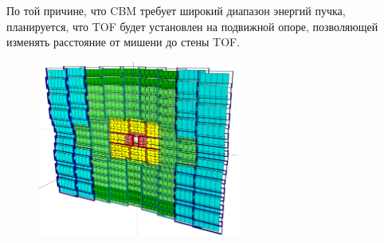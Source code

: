 По той причине, что CBM требует широкий диапазон энергий пучка, планируется, что TOF будет установлен на подвижной опоре, позволяющей изменять расстояние от мишени до стены TOF.


\begin{figure}[H]
\includegraphics[width=0.6\textwidth]{pictures/TOF.png}
\caption{}
\label{fig:TOF}
\end{figure}

